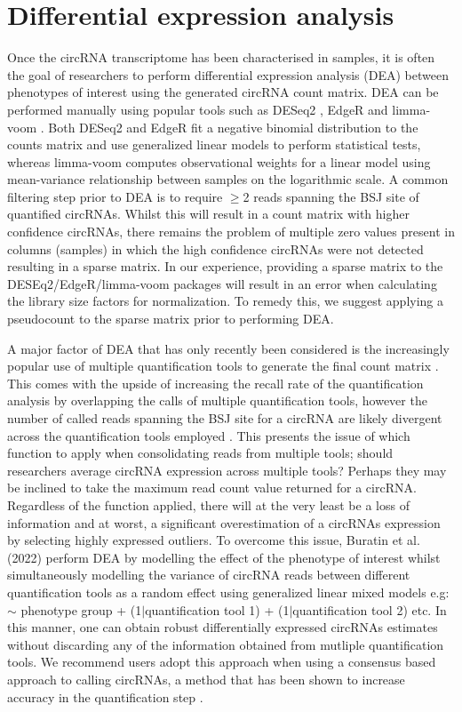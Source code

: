 \documentclass[journal,review,submit,pdftex,moreauthors]{Definitions/mdpi}
\begin{document}
\section{Differential expression analysis}
Once the circRNA transcriptome has been characterised in samples, it is often the goal of researchers to perform differential expression analysis (DEA) between phenotypes of interest using the generated circRNA count matrix. DEA can be performed manually using popular tools such as DESeq2 \cite{Love2014Dec}, EdgeR \cite{Robinson2010Jan} and limma-voom \cite{Law2014Feb}. Both DESeq2 and EdgeR fit a negative binomial distribution to the counts matrix and use generalized linear models to perform statistical tests, whereas limma-voom computes observational weights for a linear model using mean-variance relationship between samples on the logarithmic scale. A common filtering step prior to DEA is to require $\geq$2 reads spanning the BSJ site of quantified circRNAs. Whilst this will result in a count matrix with higher confidence circRNAs, there remains the problem of multiple zero values present in columns (samples) in which the high confidence circRNAs were not detected resulting in a sparse matrix. In our experience, providing a sparse matrix to the DESEq2/EdgeR/limma-voom packages will result in an error when calculating the library size factors for normalization. To remedy this, we suggest applying a pseudocount to the sparse matrix prior to performing DEA. \par
A major factor of DEA that has only recently been considered is the increasingly popular use of multiple quantification tools to generate the final count matrix \cite{Hansen2018, CirComPara2, Digby2023Dec}. This comes with the upside of increasing the recall rate of the quantification analysis by overlapping the calls of multiple quantification tools, however the number of called reads spanning the BSJ site for a circRNA are likely divergent across the quantification tools employed \cite{Hansen2016Apr,Hansen2018}. This presents the issue of which function to apply when consolidating reads from multiple tools; should researchers average circRNA expression across multiple tools? Perhaps they may be inclined to take the maximum read count value returned for a circRNA. Regardless of the function applied, there will at the very least be a loss of information and at worst, a significant overestimation of a circRNAs expression by selecting highly expressed outliers. To overcome this issue, Buratin et al. (2022) \cite{Buratin2022} perform DEA by modelling the effect of the phenotype of interest whilst simultaneously modelling the variance of circRNA reads between different quantification tools as a random effect using generalized linear mixed models e.g: $\sim$ phenotype group + (1$\vert$quantification tool 1) + (1$\vert$quantification tool 2) etc. In this manner, one can obtain robust differentially expressed circRNAs estimates without discarding any of the information obtained from mutliple quantification tools. We recommend users adopt this approach when using a consensus based approach to calling circRNAs, a method that has been shown to increase accuracy in the quantification step \cite{Hansen2018}. \par
\end{document}
